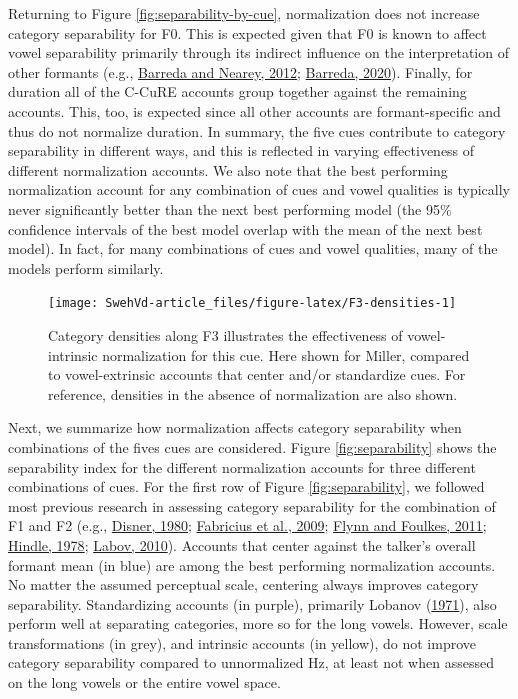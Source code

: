 \documentclass[utf8]{frontiersSCNS}
\begin{document}
Returning to Figure \ref{fig:separability-by-cue}, normalization does not increase category separability for F0. This is expected given that F0 is known to affect vowel separability primarily through its indirect influence on the interpretation of other formants (e.g., \protect\hyperlink{ref-barreda2012a}{Barreda and Nearey, 2012}; \protect\hyperlink{ref-barreda2020a}{Barreda, 2020}). Finally, for duration all of the C-CuRE accounts group together against the remaining accounts. This, too, is expected since all other accounts are formant-specific and thus do not normalize duration. In summary, the five cues contribute to category separability in different ways, and this is reflected in varying effectiveness of different normalization accounts. We also note that the best performing normalization account for any combination of cues and vowel qualities is typically never significantly better than the next best performing model (the 95\% confidence intervals of the best model overlap with the mean of the next best model). In fact, for many combinations of cues and vowel qualities, many of the models perform similarly.



\begin{figure}

{\centering \texttt{[image: SwehVd-article\_files/figure-latex/F3-densities-1]} 

}

\caption{Category densities along F3 illustrates the effectiveness of vowel-intrinsic normalization for this cue. Here shown for Miller, compared to vowel-extrinsic accounts that center and/or standardize cues. For reference, densities in the absence of normalization are also shown.}\label{fig:F3-densities}
\end{figure}

Next, we summarize how normalization affects category separability when combinations of the fives cues are considered. Figure \ref{fig:separability} shows the separability index for the different normalization accounts for three different combinations of cues. For the first row of Figure \ref{fig:separability}, we followed most previous research in assessing category separability for the combination of F1 and F2 (e.g., \protect\hyperlink{ref-disner1980}{Disner, 1980}; \protect\hyperlink{ref-fabricius2009}{Fabricius et al., 2009}; \protect\hyperlink{ref-Flynn2011}{Flynn and Foulkes, 2011}; \protect\hyperlink{ref-hindle1978}{Hindle, 1978}; \protect\hyperlink{ref-labov2010}{Labov, 2010}). Accounts that center against the talker's overall formant mean (in blue) are among the best performing normalization accounts. No matter the assumed perceptual scale, centering always improves category separability. Standardizing accounts (in purple), primarily Lobanov (\protect\hyperlink{ref-lobanov1971}{1971}), also perform well at separating categories, more so for the long vowels. However, scale transformations (in grey), and intrinsic accounts (in yellow), do not improve category separability compared to unnormalized Hz, at least not when assessed on the long vowels or the entire vowel space.
\end{document}
